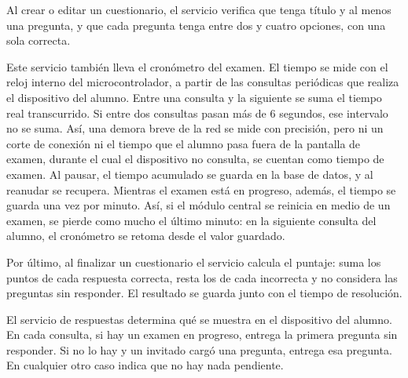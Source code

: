 Al crear o editar un cuestionario, el servicio verifica que tenga título y al menos una pregunta, y que cada pregunta tenga entre dos y cuatro opciones, con una sola correcta.



Este servicio también lleva el cronómetro del examen. El tiempo se mide con el reloj interno del microcontrolador, a partir de las consultas periódicas que realiza el dispositivo del alumno. Entre una consulta y la siguiente se suma el tiempo real transcurrido. Si entre dos consultas pasan más de 6 segundos, ese intervalo no se suma. Así, una demora breve de la red se mide con precisión, pero ni un corte de conexión ni el tiempo que el alumno pasa fuera de la pantalla de examen, durante el cual el dispositivo no consulta, se cuentan como tiempo de examen. Al pausar, el tiempo acumulado se guarda en la base de datos, y al reanudar se recupera. Mientras el examen está en progreso, además, el tiempo se guarda una vez por minuto. Así, si el módulo central se reinicia en medio de un examen, se pierde como mucho el último minuto: en la siguiente consulta del alumno, el cronómetro se retoma desde el valor guardado.

Por último, al finalizar un cuestionario el servicio calcula el puntaje: suma los puntos de cada respuesta correcta, resta los de cada incorrecta y no considera las preguntas sin responder. El resultado se guarda junto con el tiempo de resolución.


El servicio de respuestas determina qué se muestra en el dispositivo del alumno. En cada consulta, si hay un examen en progreso, entrega la primera pregunta sin responder. Si no lo hay y un invitado cargó una pregunta, entrega esa pregunta. En cualquier otro caso indica que no hay nada pendiente.

